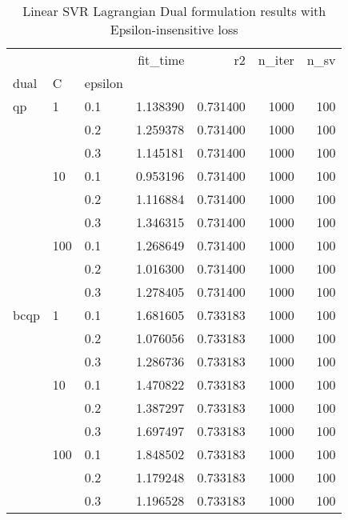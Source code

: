 \begin{table}[H]
\centering
\caption{Linear SVR Lagrangian Dual formulation results with Epsilon-insensitive loss}
\label{linear_lagrangian_dual_svr_cv_results}
\begin{tabular}{lllrrrr}
\toprule
     &     &     &  fit\_time &        r2 &  n\_iter &  n\_sv \\
dual & C & epsilon &           &           &         &       \\
\midrule
qp & 1   & 0.1 &  1.138390 &  0.731400 &    1000 &   100 \\
     &     & 0.2 &  1.259378 &  0.731400 &    1000 &   100 \\
     &     & 0.3 &  1.145181 &  0.731400 &    1000 &   100 \\
     & 10  & 0.1 &  0.953196 &  0.731400 &    1000 &   100 \\
     &     & 0.2 &  1.116884 &  0.731400 &    1000 &   100 \\
     &     & 0.3 &  1.346315 &  0.731400 &    1000 &   100 \\
     & 100 & 0.1 &  1.268649 &  0.731400 &    1000 &   100 \\
     &     & 0.2 &  1.016300 &  0.731400 &    1000 &   100 \\
     &     & 0.3 &  1.278405 &  0.731400 &    1000 &   100 \\
bcqp & 1   & 0.1 &  1.681605 &  0.733183 &    1000 &   100 \\
     &     & 0.2 &  1.076056 &  0.733183 &    1000 &   100 \\
     &     & 0.3 &  1.286736 &  0.733183 &    1000 &   100 \\
     & 10  & 0.1 &  1.470822 &  0.733183 &    1000 &   100 \\
     &     & 0.2 &  1.387297 &  0.733183 &    1000 &   100 \\
     &     & 0.3 &  1.697497 &  0.733183 &    1000 &   100 \\
     & 100 & 0.1 &  1.848502 &  0.733183 &    1000 &   100 \\
     &     & 0.2 &  1.179248 &  0.733183 &    1000 &   100 \\
     &     & 0.3 &  1.196528 &  0.733183 &    1000 &   100 \\
\bottomrule
\end{tabular}
\end{table}
